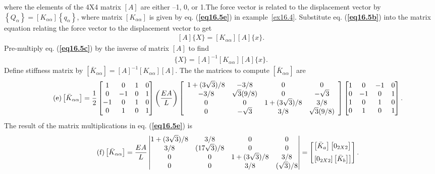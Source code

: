 \documentclass{AeroStructure-ERJohnson}
\begin{document}
\begin{example}
\noindent where the elements of the 4X4 matrix $[A]$ are either –1, 0, or 1.The force vector is related to the displacement vector by $\left\{Q_{\alpha}\right\}=\left[K_{\alpha \alpha}\right]\left\{q_{\alpha}\right\}$, where matrix $\left[K_{\alpha \alpha}\right]$ is given by eq. (\textbf{\ref{eq16.5e}}) in example~\ref{ex16.4}. Substitute eq. (\textbf{\ref{eq16.5b}}) into the matrix equation relating the force vector to the displacement vector to get
\begin{align}\label{eq16.5c}\tag{c}
[A]\{X\}=\left[K_{\alpha \alpha}\right][A]\{x\}.
\end{align}
Pre-multiply eq. (\textbf{\ref{eq16.5c}}) by the inverse of matrix $[A]$ to find
\begin{align}\label{eq16.5d}\tag{d}
\{X\}=[A]^{-1}\left[K_{\alpha \alpha}\right][A]\{x\}.
\end{align}
Define stiffness matrix by $\left[\bar{K}_{\alpha \alpha}\right]=[A]^{-1}\left[K_{\alpha \alpha}\right][A]$. The the matrices to compute $\left[\bar{K}_{\alpha \alpha}\right]$ are
\begin{align}\label{eq16.5e}\tag{e}
\left[\bar{K}_{\alpha \alpha}\right]=\frac{1}{2}\left[\begin{array}{@{}cccc@{}}1 & 0 & 1 & 0 \\0 & -1 & 0 & 1 \\-1 & 0 & 1 & 0 \\0 & 1 & 0 & 1\end{array}\right]\left(\frac{E A}{L}\right)\left[\begin{array}{ccccc}1+(3 \sqrt{3}) / 8 & -3 / 8 & 0 & 0  \\-3 / 8 & \sqrt{3}(9 / 8) & 0 & -\sqrt{3} \\0 & 0 & 1+(3 \sqrt{3}) / 8 & 3 / 8\\0 & -\sqrt{3} &3 / 8 & \sqrt{3}(9 / 8)  \end{array}\right]
\left[\begin{array}{@{}cccc@{}}1 & 0 & -1 & 0 \\0 & -1 & 0 & 1 \\1 & 0 & 1 & 0 \\0 & 1 & 0 & 1\end{array}\right].
\end{align}
The result of the matrix multiplications in eq. (\textbf{\ref{eq16.5e}}) is
\begin{align}\label{eq16.5f}\tag{f}
\left[\bar{K}_{\alpha \alpha}\right]=\frac{E A}{L}\left|\begin{array}{@{}cccc@{}}1+(3 \sqrt{3}) / 8 & 3 / 8 & 0 & 0 \\3 / 8 & (17 \sqrt{3}) / 8 & 0 & 0 \\0 & 0 & 1+(3 \sqrt{3}) / 8 & 3 / 8 \\0 & 0 & 3 / 8 & (\sqrt{3}) / 8\end{array}\right|=\left[\begin{array}{@{}c@{}}{\left[\bar{K}_{a}\right]\left[\begin{array}{@{}c@{}}0_{2 X 2}\end{array}\right]} \\[6pt]\left.\left[0_{2 X 2}\right]\left[\bar{K}_{b}\right]\right]\end{array}\right].

\end{align}
\end{example}
\end{document}
